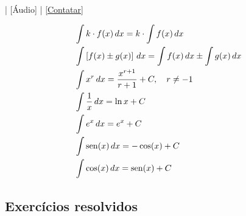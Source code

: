 \begin{flushright}
  [Vídeo] | [Áudio] | \href{https://phkonzen.github.io/notas/contato.html}{[Contatar]}
\end{flushright}

\begin{small}
\begin{align}
  & \int k\cdot f(x)\,dx = k\cdot\int f(x)\,dx\\
  & \int \left[f(x)\pm g(x)\right]\,dx = \int f(x)\,dx \pm \int g(x)\,dx\\
  & \int x^r\,dx = \frac{x^{r+1}}{r+1} + C,\quad r\neq -1\\
  & \int \frac{1}{x}\,dx = \ln x + C \\
  & \int e^x\,dx = e^x + C \\
  & \int \operatorname{sen}(x)\,dx = -\cos(x) + C \\
  & \int \cos(x)\,dx = \operatorname{sen}(x) + C
\end{align}
\end{small}

\subsection{Exercícios resolvidos}


